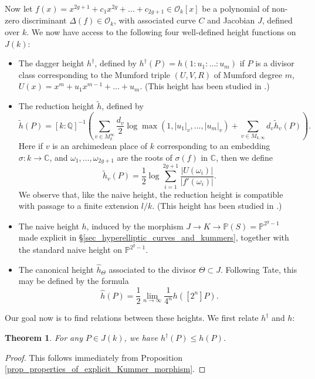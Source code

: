 \documentclass{article} %
\newtheorem{theorem}[proposition]{Theorem}
\numberwithin{equation}{section}
\renewcommand{\P}{\mathbb{P}}
\newcommand{\cO}{\mathcal{O}}
\newcommand{\Q}{\mathbb{Q}}
\newcommand{\bC}{\mathbb{C}}
\begin{document}
Now let $f(x) = x^{2g+1} + c_1 x^{2g} + \dots + c_{2g+1} \in \cO_k[x]$ be a polynomial of non-zero discriminant $\Delta(f) \in \cO_k$, with associated curve $C$ and Jacobian $J$, defined over $k$. We now have access to the following four well-defined height functions on $J(k)$:
\begin{itemize}
    \item The dagger height $h^\dagger$, defined by $h^\dagger(P) = h( 1 : u_1 : \dots : u_m )$ if $P$ is a divisor class corresponding to the Mumford triple $(U, V, R)$ of Mumford degree $m$, $U(x) = x^m + u_1 x^{m-1} + \dots + u_m$. (This height has been studied in \cite[\S6]{holmes-arakelovapproachnaiveheighthyperelliptic}.)
    \item The reduction height $\widetilde{h}$, defined by
    \[ \widetilde{h}(P) = [k : \Q]^{-1} \left(  \sum_{v \in M_k^\infty} \frac{d_v}{2} \log \max (1, |u_1|_v, \dots, |u_m|_v) + \sum_{v \in M_{k, \infty}} d_v \widetilde{h}_v(P) \right). \]
    Here if $v$ is an archimedean place of $k$ corresponding to an embedding $\sigma : k \to \bC$, and $\omega_1, \dots, \omega_{2g+1}$ are the roots of $\sigma(f)$ in $\bC$, then we define 
    \[ \widetilde{h}_v(P) = \frac{1}{2} \log \sum_{i=1}^{2g+1} \frac{|U(\omega_i)|}{|f'(\omega_i)|}. \]
    We observe that, like the naive height, the reduction height is compatible with passage to a finite extension $l / k$.  (This height has been studied in \cite{lagathorne2024smallheightoddhyperelliptic}.)
    \item The naive height $h$, induced by the morphism $J \to K \to \P(S) = \P^{2^g-1}$ made explicit in \S\ref{sec_hyperelliptic_curves_and_kummers}, together with the standard naive height on $\P^{2^g-1}$.
    \item The canonical height $\widehat{h}_\Theta$ associated to the divisor $\Theta \subset J$. Following Tate, this may be defined by the formula
    \[ \widehat{h}(P) =  \frac{1}{2}  \lim_{n \to \infty} \frac{1}{4^n}  h([2^n] P). \]
\end{itemize}
Our goal now is to find relations between these heights. We first relate $h^\dagger$ and $h$:
\begin{theorem}\label{thm_naive_height_lower_bound}
    For any $P \in J(k)$, we have $h^\dagger(P) \leq h(P)$. 
\end{theorem}
\begin{proof}
    This follows immediately from Proposition \ref{prop_properties_of_explicit_Kummer_morphism}.
\end{proof}
\end{document}
